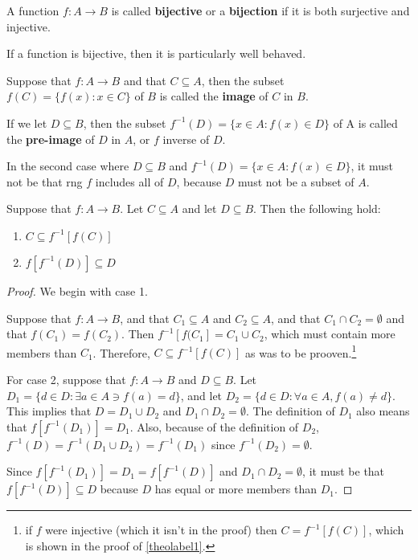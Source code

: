 \begin{definition}[Bijection]
	A function $f:A\rightarrow B$ is called \textbf{bijective} or a \textbf{bijection} if it is both surjective and injective.
\end{definition}

If a function is bijective, then it is particularly well behaved.

\begin{definition}
	\label{image}
	Suppose that $f:A\rightarrow B$ and that $C\subseteq A$, then the subset $f(C) = \{f(x):x\in C\}$ of $B$ is called the \textbf{image} of $C$ in $B$.
	
	If we let $D\subseteq B$, then the subset $f^{-1}(D)=\{x\in A: f(x)\in D\}$ of A is called the \textbf{pre-image} of $D$ in $A$, or $f$ inverse of $D$. 
\end{definition}

\begin{remark}
	In the second case where $D\subseteq B$ and $f^{-1}(D)=\{x\in A: f(x)\in D\}$, it must not be that rng $f$ includes all of $D$, because $D$ must not be a subset of $A$.
\end{remark}

\begin{theorem}
	Suppose that $f:A\rightarrow B$. Let $C\subseteq A$ and let $D\subseteq B$. Then the following hold:
	\begin{enumerate}
		\item $C \subseteq f^{-1}[f(C)]$
		\item $f[f^{-1}(D)]\subseteq D$
	\end{enumerate}
\end{theorem}
	
\begin{proof}
	We begin with case 1.
	
	Suppose that $f:A\rightarrow B$, and that $C_1\subseteq A$ and $C_2\subseteq A$, and that $C_1 \cap C_2 = \emptyset$ and that $f(C_1)=f(C_2)$. Then $f^{-1}[f(C_1]=C_1 \cup C_2$, which must contain more members than $C_1$. Therefore, $C\subseteq f^{-1}[f(C)]$ as was to be prooven.\footnote{if $f$ were injective (which it isn't in the proof) then $C = f^{-1}[f(C)]$, which is shown in the proof of \ref{theolabel1}.} \bigskip
	
	For case 2, suppose that $f:A\rightarrow B$ and $D\subseteq B$. Let $D_1 = \{d\in D: \exists a\in A \ni f(a)=d\}$, and let $D_2 = \{d\in D: \forall a\in A,f(a)\neq d\}$. This implies that $D = D_1 \cup D_2$ and $D_1 \cap D_2 = \emptyset$. The definition of $D_1$ also means that $f[f^{-1}(D_1)] = D_1$. Also, because of the definition of $D_2$, $f^{-1}(D)=f^{-1}(D_1\cup D_2)=f^{-1}(D_1)$ since $f^{-1}(D_2)=\emptyset$.
	
	Since $f[f^{-1}(D_1)] = D_1 = f[f^{-1}(D)]$ and $D_1 \cap D_2 = \emptyset$, it must be that $f[f^{-1}(D)]\subseteq D$ because $D$ has equal or more members than $D_1$.
\end{proof}


